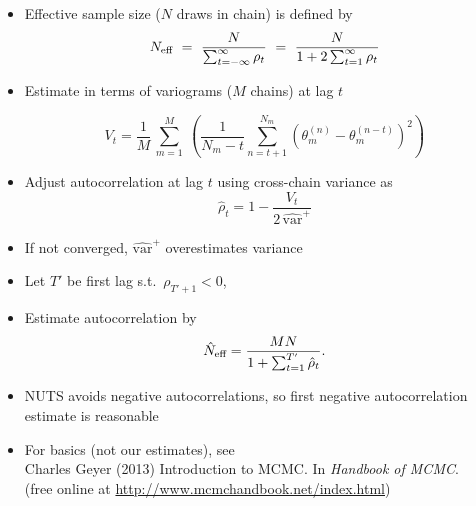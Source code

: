 \documentclass[10pt]{report}
\begin{document}
\begin{itemize}\small
\item Effective sample size ($N$ draws in chain) is defined by
\[
N_{\mbox{\scriptsize eff}}
\ = \
\frac{N}{\sum_{t = -\infty}^{\infty} \rho_t}
\ = \
\frac{N}{1 + 2 \sum_{t = 1}^{\infty} \rho_t}
\]
\item Estimate in terms of variograms ($M$ chains) at lag $t$
\[
V_t = 
\frac{1}{M}
\,
\sum_{m=1}^M 
\
\left(
\frac{1}{N_m - t}
\sum_{n=t+1}^{N_m}
\left(
\theta_m^{(n)} - \theta_m^{(n-t)}
\right)^2
\right)
\]
\item Adjust autocorrelation at lag $t$ using cross-chain variance
  as
\[
\hat{\rho}_t
= 1 - \frac{\displaystyle V_t}{
            \displaystyle 2 \, \widehat{\mbox{var}}^{+}}
\]
\item If not converged, $\widehat{\mbox{var}}^{+}$ overestimates variance
\end{itemize}

\sld{Estimating $N_{\normalsize eff}$}
\begin{itemize}
\item Let $T'$ be first lag s.t.\ $\rho_{T' + 1} < 0$, 
\item Estimate autocorrelation by
\[
\hat{N}_{\mbox{\scriptsize eff}}
= 
\frac{MN}
     {1 + \sum_{t=1}^{T'} \hat{\rho}_t}.
\]
\item NUTS avoids negative autocorrelations, so first negative
  autocorrelation estimate is reasonable
\vfill
\item 
{\footnotesize For basics (not our estimates), see \\
Charles Geyer (2013) Introduction to MCMC. In
    {\slshape Handbook of MCMC}.
\\
(free online at \url{http://www.mcmchandbook.net/index.html})}
\end{itemize}
\end{document}
